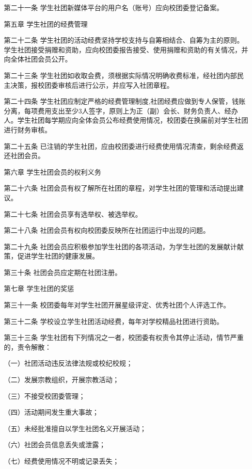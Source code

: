 \documentclass[UTF8,12pt,a4paper]{report}
\begin{document}
第二十一条  学生社团新媒体平台的用户名（账号）应向校团委登记备案。



第五章  学生社团的经费管理

第二十二条  学生社团的活动经费坚持学校支持与自筹相结合、自筹为主的原则。学生社团接受捐赠和资助，应向校团委报告接受、使用捐赠和资助的有关情况，并向全体社团会员公开。

第二十三条  学生社团如收取会费，须根据实际情况明确收费标准，经社团内部民主决策，报校团委审核后进行公示，并应写入社团章程。

第二十四条  学生社团应制定严格的经费管理制度,社团经费应做到专人保管，钱账分离，每项费用支出至少3人签字，原则上为正（副）会长、财务负责人、经办人。学生社团每学期应向全体会员公布经费使用情况，校团委在换届前对学生社团进行财务审核。

第二十五条  已注销的学生社团，应由校团委进行经费使用情况清查，剩余经费返还社团会员。



第六章  学生社团会员的权利义务

第二十六条  社团会员有权了解所在社团的章程，对学生社团的管理和活动提出建议。

第二十七条  社团会员享有选举权、被选举权。

第二十八条  社团会员有权向校团委反映所在社团运行中出现的问题。

第二十九条  社团会员应积极参加学生社团的各项活动，为学生社团的发展献计献策，促进学生社团的健康发展。

第三十条  社团会员应定期在社团注册。



第七章  学生社团的奖惩

第三十一条  校团委每年对学生社团开展星级评定、优秀社团个人评选工作。

第三十二条  学校设立学生社团活动经费，每年对学校精品社团进行资助。

第三十三条  学生社团有下列情况之一者，校团委有权责令其停止活动，情节严重的，责令解散：

（一）社团活动违反法律法规或校纪校规；

（二）发展宗教组织，开展宗教活动；

（三）不接受校团委管理；

（四）活动期间发生重大事故；

（五）未经批准擅自以学生社团名义开展活动；

（六）社团会员信息丢失或泄露；

（七）经费使用情况不明或记录丢失；
\end{document}
